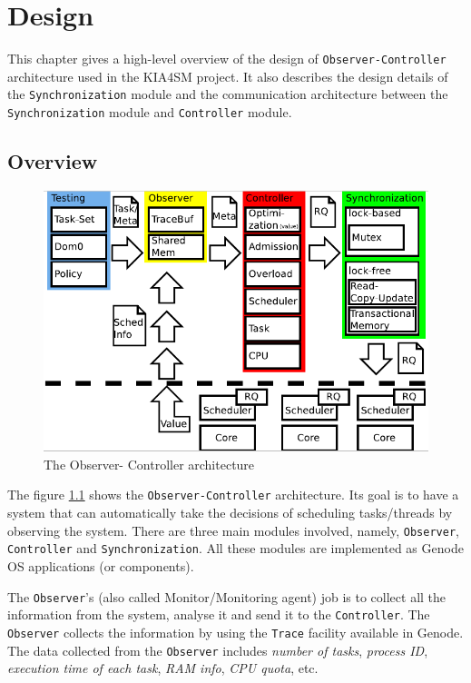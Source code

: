 \chapter{Design}\label{design}

This chapter gives a high-level overview of the  design of \texttt{Observer-Controller} architecture used in the KIA4SM project. It also describes the design details of  the \texttt{Synchronization} module and the communication architecture between the \texttt{Synchronization} module and \texttt{Controller} module.

\section{Overview}

\begin{figure}[h]
  \centering
  \includegraphics[scale = 0.7]{figures/oc.png}
  \caption{The Observer- Controller architecture}\label{oc}
\end{figure}

The figure \ref{oc} shows the \texttt{Observer-Controller} architecture. Its goal is to have a system that can automatically take the decisions of scheduling tasks/threads by observing the system. There are three main modules involved, namely, \texttt{Observer}, \texttt{Controller} and \texttt{Synchronization}. All these modules are implemented as Genode OS applications (or components).

The \texttt{Observer}'s (also called Monitor/Monitoring agent) job is to collect all the information from the system, analyse it and send it to the \texttt{Controller}. The \texttt{Observer} collects the information by using the \texttt{Trace} facility available in Genode. The data collected from the \texttt{Observer} includes \textit{number of tasks}, \textit{process ID}, \textit{execution time of each task}, \textit{RAM info}, \textit{CPU quota}, etc.


